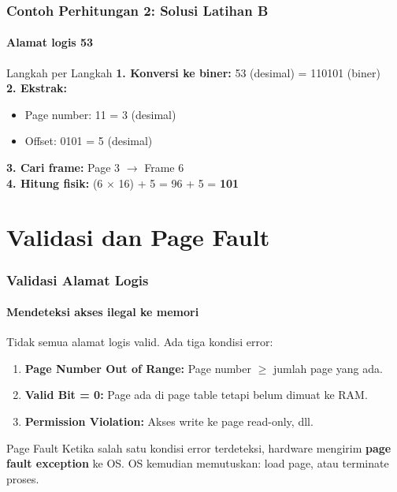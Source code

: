 \documentclass[t,aspectratio=169,xcolor=dvipsnames]{beamer}
\begin{document}
\begin{frame}[fragile]
    \frametitle{Contoh Perhitungan 2: Solusi Latihan B}
    \framesubtitle{Alamat logis 53}
    \small

    \begin{block}{Langkah per Langkah}
        \textbf{1. Konversi ke biner:} 53 (desimal) = 110101 (biner) \\
        \textbf{2. Ekstrak:}
        \begin{itemize}
            \item Page number: 11 = 3 (desimal)
            \item Offset: 0101 = 5 (desimal)
        \end{itemize}
        \textbf{3. Cari frame:} Page 3 $\rightarrow$ Frame 6 \\
        \textbf{4. Hitung fisik:} (6 $\times$ 16) + 5 = 96 + 5 = \textbf{101}
    \end{block}
\end{frame}

\section{Validasi dan Page Fault}

\begin{frame}
    \frametitle{Validasi Alamat Logis}
    \framesubtitle{Mendeteksi akses ilegal ke memori}
    \small

    Tidak semua alamat logis valid. Ada tiga kondisi error:

    \vspace{0.2cm}
    \begin{enumerate}
        \item \textbf{Page Number Out of Range:} Page number $\geq$ jumlah page yang ada.
        \item \textbf{Valid Bit = 0:} Page ada di page table tetapi belum dimuat ke RAM.
        \item \textbf{Permission Violation:} Akses write ke page read-only, dll.
    \end{enumerate}

    \vspace{0.2cm}
    \begin{alertblock}{Page Fault}
        Ketika salah satu kondisi error terdeteksi, hardware mengirim \textbf{page fault exception} ke OS.
        OS kemudian memutuskan: load page, atau terminate proses.
    \end{alertblock}
\end{frame}
\end{document}
